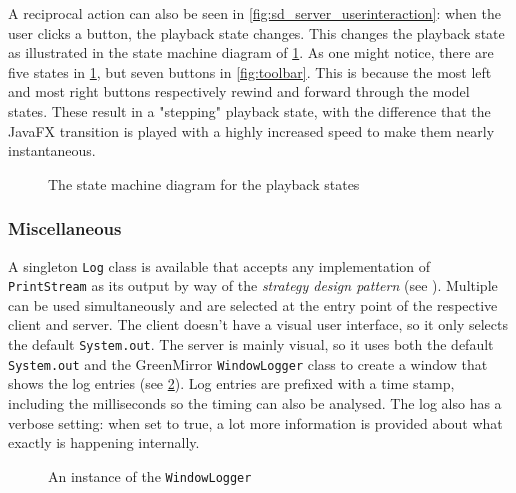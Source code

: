 \documentclass[a4paper]{article}
\begin{document}
A reciprocal action can also be seen in \cref{fig:sd_server_userinteraction}: when the user clicks a button, the playback state changes. This changes the playback state as illustrated in the state machine diagram of \cref{fig:smd_playbackstates}. As one might notice, there are five states in \cref{fig:smd_playbackstates}, but seven buttons in \cref{fig:toolbar}. This is because the most left and most right buttons respectively rewind and forward through the model states. These result in a "stepping" playback state, with the difference that the JavaFX transition is played with a highly increased speed to make them nearly instantaneous.
\begin{figure}[H]
  \centering
  \caption{The state machine diagram for the playback states}
  \label{fig:smd_playbackstates}
\end{figure}


\subsubsection{Miscellaneous}\label{subsubsec:misc}
A singleton \lstinline{Log} class is available that accepts any implementation of \lstinline{PrintStream} as its output by way of the \emph{strategy design pattern} (see \cite{kuchana2004,sourcemaking}). Multiple can be used simultaneously and are selected at the entry point of the respective client and server. The client doesn't have a visual user interface, so it only selects the default \lstinline{System.out}. The server is mainly visual, so it uses both the default \lstinline{System.out} and the GreenMirror \lstinline{WindowLogger} class to create a window that shows the log entries (see \cref{fig:log}). Log entries are prefixed with a time stamp, including the milliseconds so the timing can also be analysed. The log also has a verbose setting: when set to true, a lot more information is provided about what exactly is happening internally.
\begin{figure}[H]
  \centering
  \caption{An instance of the \lstinline{WindowLogger}}
  \label{fig:log}
\end{figure}
\end{document}
